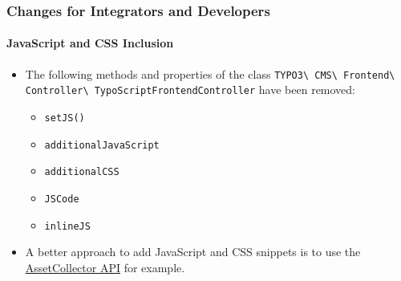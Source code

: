 %

\begin{frame}[fragile]
	\frametitle{Changes for Integrators and Developers}
	\framesubtitle{JavaScript and CSS Inclusion}


	\begin{itemize}
		\item The following methods and properties of the class
			\smaller\texttt{TYPO3\textbackslash
				CMS\textbackslash
				Frontend\textbackslash
				Controller\textbackslash
				TypoScriptFrontendController}\normalsize\newline
			have been removed:

			\begin{itemize}
				\item \texttt{setJS()}
				\item \texttt{additionalJavaScript}
				\item \texttt{additionalCSS}
				\item \texttt{JSCode}
				\item \texttt{inlineJS}
			\end{itemize}

		\item A better approach to add JavaScript and CSS snippets is to use the
			\href{https://docs.typo3.org/m/typo3/reference-coreapi/master/en-us/ApiOverview/Assets/Index.html}{AssetCollector API}
			for example.
	\end{itemize}

\end{frame}


